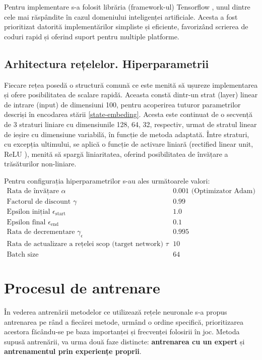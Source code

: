 Pentru implementare s-a folosit librăria (framework-ul) Tensorflow \cite{tensorflow}, unul dintre cele mai răspândite în cazul domeniului inteligenței artificiale. Acesta a fost prioritizat datorită implementărilor simpliste și eficiente, favorizând scrierea de coduri rapid și oferind suport pentru multiple platforme.

\subsection{Arhitectura rețelelor. Hiperparametrii}
Fiecare rețea posedă o structură comună ce este menită să ușureze implementarea și ofere posibilitatea de scalare rapidă. Aceasta constă dintr-un strat (layer) linear \cite{tensorflow_linear} de intrare (input) de dimensiuni 100, pentru acoperirea tuturor parametrilor descriși în encodarea stării \ref{state-embeding}. Acesta este continuat de o secvență de 3 straturi liniare cu dimensiunile 128, 64, 32, respectiv, urmat de stratul linear de ieșire cu dimensiune variabilă, în funcție de metoda adaptată. Între straturi, cu excepția ultimului, se aplică o funcție de activare liniară (rectified linear unit, ReLU \cite{tensorflow_relu}), menită să spargă liniaritatea, oferind posibilitatea de învățare a trăsăturilor non-liniare.

Pentru configurația hiperparametrilor s-au ales următoarele valori:
\\
\[
\begin{array}{ll}
\text{Rata de învățare } \alpha & 0.001 \text{ (Optimizator Adam)} \\
\text{Factorul de discount } \gamma & 0.99 \\
\text{Epsilon inițial } \epsilon_{\text{start}} & 1.0 \\
\text{Epsilon final } \epsilon_{\text{end}} & 0.1 \\
\text{Rata de decrementare } \gamma_\epsilon & 0.995 \\
\text{Rata de actualizare a rețelei scop (target network) } \tau & 10 \\
\text{Batch size} & 64
\end{array}
\]

\section{Procesul de antrenare}
În vederea antrenării metodelor ce utilizează rețele neuronale s-a propus antrenarea pe rând a fiecărei metode, urmând o ordine specifică, prioritizarea acestora făcându-se pe baza importanței și frecvenței folosirii în joc. Metoda supusă antrenării, va urma două faze distincte: \textbf{antrenarea cu un expert} și \textbf{antrenamentul prin experiențe proprii}.

